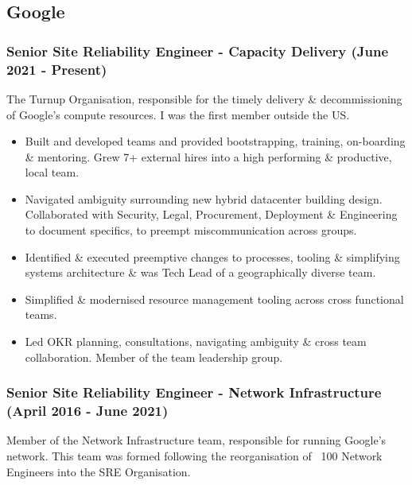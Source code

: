 \documentclass[a4paper, 10pt] {article}
\begin{document}
\subsection*{Google}

\subsubsection*{Senior Site Reliability Engineer - Capacity Delivery (June 2021 - Present)}

The Turnup Organisation, responsible for the timely delivery \&
decommissioning of Google's compute resources. I was the first member
outside the US.

\begin{itemize}[noitemsep]
	\item Built and developed teams and provided bootstrapping, training, 
		on-boarding \& mentoring. Grew 7+ external hires into a high performing \&
		productive, local team.
  	\item Navigated ambiguity surrounding new hybrid datacenter building design.
		Collaborated with Security, Legal, Procurement, Deployment \& 
		Engineering to document specifics, to preempt miscommunication across groups.
	\item Identified \& executed preemptive changes to processes, tooling \& simplifying systems
		architecture \& was Tech Lead of a geographically diverse team.
	\item Simplified \& modernised resource management tooling across cross functional teams.
	\item Led OKR planning, consultations, navigating ambiguity \& cross team collaboration. Member
		of the team leadership group.
\end{itemize}

\subsubsection*{Senior Site Reliability Engineer - Network Infrastructure (April 2016 - June 2021)}

Member of the Network Infrastructure team, responsible for running
Google's network. This team was formed following the reorganisation of
~100 Network Engineers into the SRE Organisation.
\end{document}
